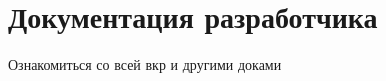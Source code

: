 \chapter{Документация разработчика}
\label{cha:app:developer}

Ознакомиться со всей вкр и другими доками
